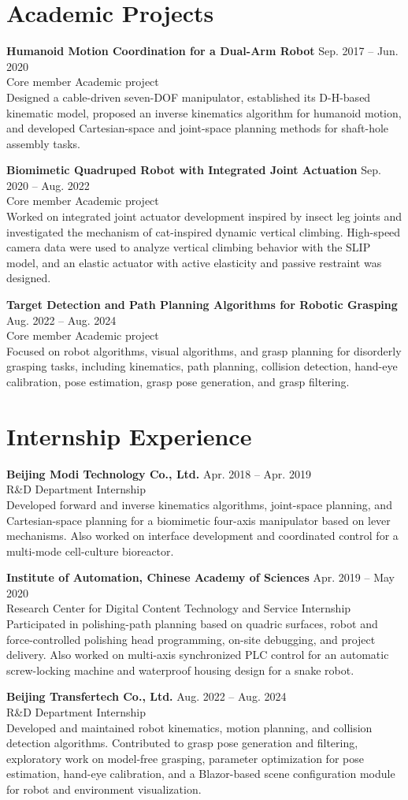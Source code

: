 \documentclass[11pt,a4paper]{article}
\newcommand{\entry}[4]{%
  \textbf{#1} \hfill #2\\
  {\color{textgray}#3} \hfill {#4}\\[-2pt]
}
\begin{document}
\section*{Academic Projects}
\entry{Humanoid Motion Coordination for a Dual-Arm Robot}{Sep. 2017 -- Jun. 2020}{Core member}{Academic project}
Designed a cable-driven seven-DOF manipulator, established its D-H-based kinematic model, proposed an inverse kinematics algorithm for humanoid motion, and developed Cartesian-space and joint-space planning methods for shaft-hole assembly tasks.

\entry{Biomimetic Quadruped Robot with Integrated Joint Actuation}{Sep. 2020 -- Aug. 2022}{Core member}{Academic project}
Worked on integrated joint actuator development inspired by insect leg joints and investigated the mechanism of cat-inspired dynamic vertical climbing. High-speed camera data were used to analyze vertical climbing behavior with the SLIP model, and an elastic actuator with active elasticity and passive restraint was designed.

\entry{Target Detection and Path Planning Algorithms for Robotic Grasping}{Aug. 2022 -- Aug. 2024}{Core member}{Academic project}
Focused on robot algorithms, visual algorithms, and grasp planning for disorderly grasping tasks, including kinematics, path planning, collision detection, hand-eye calibration, pose estimation, grasp pose generation, and grasp filtering.

\section*{Internship Experience}
\entry{Beijing Modi Technology Co., Ltd.}{Apr. 2018 -- Apr. 2019}{R\&D Department}{Internship}
Developed forward and inverse kinematics algorithms, joint-space planning, and Cartesian-space planning for a biomimetic four-axis manipulator based on lever mechanisms. Also worked on interface development and coordinated control for a multi-mode cell-culture bioreactor.

\entry{Institute of Automation, Chinese Academy of Sciences}{Apr. 2019 -- May 2020}{Research Center for Digital Content Technology and Service}{Internship}
Participated in polishing-path planning based on quadric surfaces, robot and force-controlled polishing head programming, on-site debugging, and project delivery. Also worked on multi-axis synchronized PLC control for an automatic screw-locking machine and waterproof housing design for a snake robot.

\entry{Beijing Transfertech Co., Ltd.}{Aug. 2022 -- Aug. 2024}{R\&D Department}{Internship}
Developed and maintained robot kinematics, motion planning, and collision detection algorithms. Contributed to grasp pose generation and filtering, exploratory work on model-free grasping, parameter optimization for pose estimation, hand-eye calibration, and a Blazor-based scene configuration module for robot and environment visualization.
\end{document}
